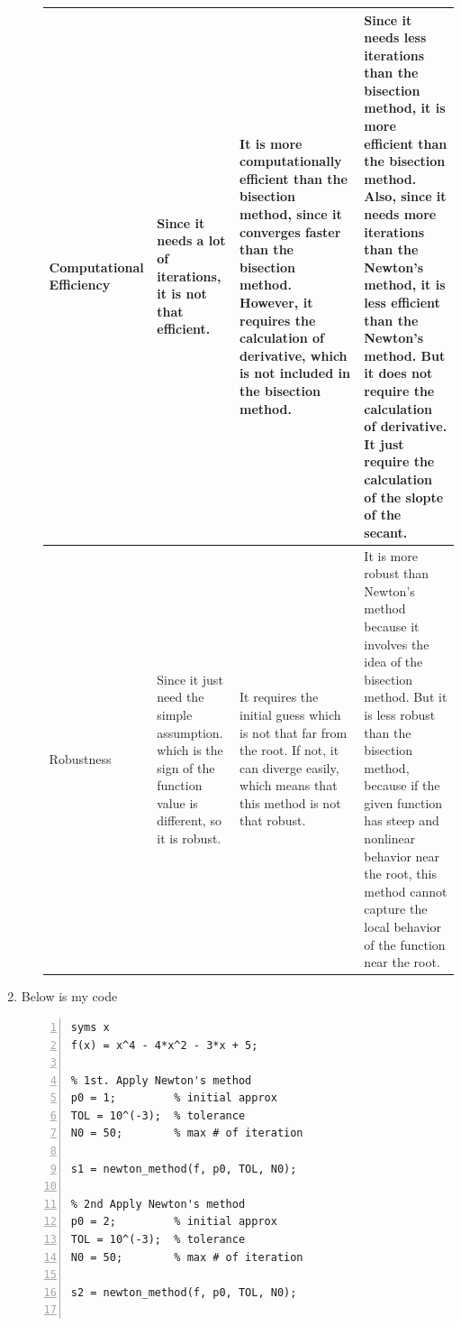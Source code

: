 \documentclass{article}
\begin{document}
\begin{enumerate}
\begin{enumerate}[wide=10pt]
\begin{table}[ht]
\begin{tabular}{|p{2.2cm}|p{3.5cm}|p{3.5cm}|p{5cm}|}
            Computational \newline Efficiency & Since it needs a lot of iterations, it is not that efficient.                                                                      & It is more computationally efficient than the bisection method, since it converges faster than the bisection method. However, it requires the calculation of derivative, which is not included in the bisection method. & Since it needs less iterations than the bisection method, it is more efficient than the bisection method. Also, since it needs more iterations than the Newton's method, it is less efficient than the Newton's method. But it does not require the calculation of derivative. It just require the calculation of the slopte of the secant.                                                  \\ \hline
            Robustness               & Since it just need the simple assumption. which is the sign of the function value is different, so it is robust.                   & It requires the initial guess which is not that far from the root. If not, it can diverge easily, which means that this method is not that robust.                                                                      & It is more robust than Newton's method because it involves the idea of the bisection method. But it is less robust than the bisection method, because if the given function has steep and nonlinear behavior near the root, this method cannot capture the local behavior of the function near the root.                                                                                     \\ \hline
            \end{tabular}
            \end{table}
    \end{enumerate}
    \item Below is my code
        \begin{lstlisting}[frame=single, numbers=left, style=Matlab-editor]
% Set our function
syms x
f(x) = x^4 - 4*x^2 - 3*x + 5;

% 1st. Apply Newton's method
p0 = 1;         % initial approx
TOL = 10^(-3);  % tolerance
N0 = 50;        % max # of iteration

s1 = newton_method(f, p0, TOL, N0);

% 2nd Apply Newton's method
p0 = 2;         % initial approx
TOL = 10^(-3);  % tolerance
N0 = 50;        % max # of iteration

s2 = newton_method(f, p0, TOL, N0);


\end{lstlisting}
\end{enumerate}
\end{document}
